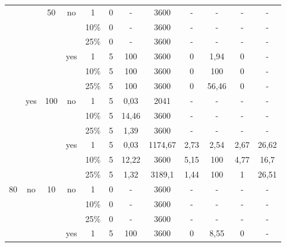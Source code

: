 \begin{table}[h!]
{\begin{tabular}{cccccccccccc}
            \cline{3-12}          &       & \multirow{6}[4]{*}{50} & \multirow{3}[2]{*}{no} & 1     & 0     & -     & 3600  & -     & -     & -     & - \bigstrut[t]\\
            &       &       &       & 10\%  & 0     & -     & 3600  & -     & -     & -     & - \\
            &       &       &       & 25\%  & 0     & -     & 3600  & -     & -     & -     & - \bigstrut[b]\\
            \cline{4-12}          &       &       & \multirow{3}[2]{*}{yes} & 1     & 5     & 100   & 3600  & 0     & 1,94  & 0     & - \bigstrut[t]\\
            &       &       &       & 10\%  & 5     & 100   & 3600  & 0     & 100   & 0     & - \\
            &       &       &       & 25\%  & 5     & 100   & 3600  & 0     & 56,46 & 0     & - \bigstrut[b]\\
            \cline{2-12}          & \multirow{6}[4]{*}{yes} & \multirow{6}[4]{*}{100} & \multirow{3}[2]{*}{no} & 1     & 5     & 0,03  & 2041  & -     & -     & -     & - \bigstrut[t]\\
            &       &       &       & 10\%  & 5     & 14,46 & 3600  & -     & -     & -     & - \\
            &       &       &       & 25\%  & 5     & 1,39  & 3600  & -     & -     & -     & - \bigstrut[b]\\
            \cline{4-12}          &       &       & \multirow{3}[2]{*}{yes} & 1     & 5     & 0,03  & 1174,67 & 2,73  & 2,54  & 2,67  & 26,62 \bigstrut[t]\\
            &       &       &       & 10\%  & 5     & 12,22 & 3600  & 5,15  & 100   & 4,77  & 16,7 \\
            &       &       &       & 25\%  & 5     & 1,32  & 3189,1 & 1,44  & 100   & 1     & 26,51 \bigstrut[b]\\
            \hline
            \multirow{24}[16]{*}{80} & \multirow{18}[12]{*}{no} & \multirow{6}[4]{*}{10} & \multirow{3}[2]{*}{no} & 1     & 0     & -     & 3600  & -     & -     & -     & - \bigstrut[t]\\
            &       &       &       & 10\%  & 0     & -     & 3600  & -     & -     & -     & - \\
            &       &       &       & 25\%  & 0     & -     & 3600  & -     & -     & -     & - \bigstrut[b]\\
            \cline{4-12}          &       &       & \multirow{3}[2]{*}{yes} & 1     & 5     & 100   & 3600  & 0     & 8,55  & 0     & - \bigstrut[t]\\

\end{tabular}}
\end{table}
